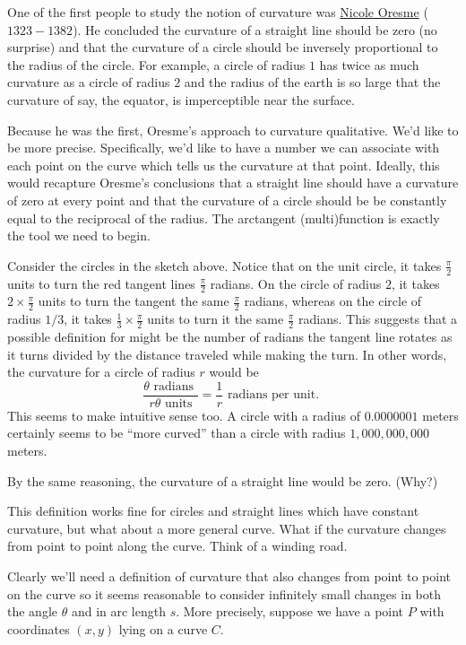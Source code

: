 One of the first people to study the notion of curvature was \href{https://mathshistory.st-andrews.ac.uk/Biographies/Oresme/}{Nicole
  Oresme} ($1323-1382$). He concluded the curvature of a straight line
should be zero (no surprise) and that the curvature of a circle should
be inversely proportional to the radius of the circle. For example, a
circle of radius $1$ has twice as much curvature as a circle of radius
$2$ and the radius of the earth is so large that the curvature of say,
the equator, is imperceptible near the surface.

Because he was the first, Oresme's approach to curvature
qualitative. We'd like to be more precise. Specifically, we'd like to
have a number we can associate with each point on the curve which
tells us the curvature at that point. Ideally, this would recapture
Oresme's conclusions that a straight line should have a curvature of
zero at every point and that the curvature of a circle should be be
constantly equal to the reciprocal of the radius. The arctangent
(multi)function is exactly the tool we need to begin.

Consider the circles in the sketch above.
Notice that on the unit circle, it takes $\frac{\pi}{2}$ units to turn
the red tangent lines
$\frac{\pi}{2}$ radians. On the circle of radius $2$, it takes
$2 \times \frac{\pi}{2}$ units to turn the tangent the same $\frac{\pi}{2}$
radians, whereas on the circle of radius $1/3$, it takes
$\frac13\times\frac{\pi}{2}$ units to turn it the same $\frac\pi2$
radians.  This suggests that a possible definition for
 might be the number of radians the tangent line
rotates as it turns divided by the distance traveled while making the
turn. In other words, the curvature for a circle of radius $r$ would
be
$$
\frac{\theta \text{ radians }}{r\theta \text{ units}}=\frac{1}{r}
\text{ radians per unit. }
$$
This seems to make intuitive sense too. A circle with a radius of $0.0000001$
meters certainly seems to be ``more curved'' than a circle with radius
$1,000,000,000$ meters.

By the same reasoning, the curvature of a straight line would be
zero. (Why?) 

This definition works fine for circles and straight lines which have
constant curvature, but what about a more general curve. What if the
curvature changes from point to point along the curve. Think of a winding
road.

Clearly we'll need a definition of curvature that also changes from point
to point on the curve so it seems reasonable to consider infinitely
small changes in both the angle $\theta$ and in arc length $s$.  More
precisely, suppose we have a point $P$ with coordinates $(x,y)$ lying
on a curve $C$.


